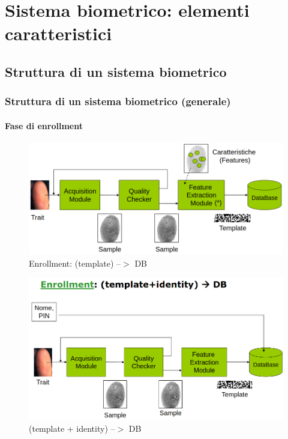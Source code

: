 \chapter{Sistema biometrico: elementi caratteristici}

\section{Struttura di un sistema biometrico}

\subsection{Struttura di un sistema biometrico (generale)}

\subsubsection{Fase di enrollment}

\begin{figure}[ht]
    \centering
    \includegraphics[width=0.95\linewidth]{chapters/images-chap2/enrollment-gen.png}
    \caption{Enrollment: (template) --$>$ DB}
    \label{fig:enroll-gen}
\end{figure}

\begin{figure}[ht]
    \centering
    \includegraphics[width=0.95\linewidth]{chapters/images-chap2/enrollment-gen-id.png}
    \caption{(template + identity) --$>$ DB}
    \label{fig:enroll-gen-id}
\end{figure}

